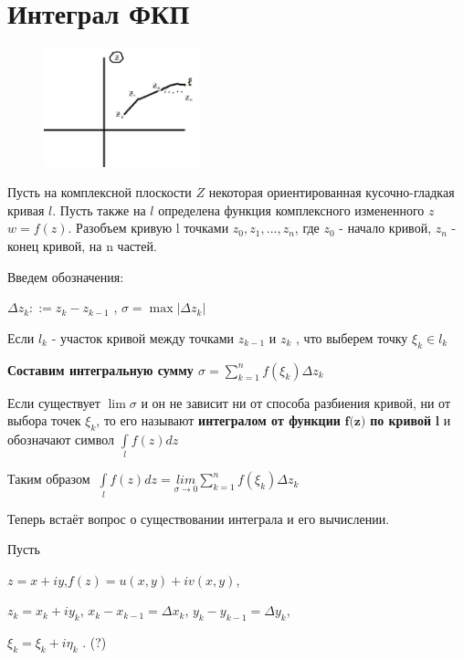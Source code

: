 \documentclass[a4paper, 12pt]{report}
\begin{document}
\section{Интеграл ФКП}
\bigskip
\begin{figure} 
    
    \includegraphics[width=0.4\textwidth]{123.png}
\end{figure}
Пусть на комплексной плоскости \(  Z \)  некоторая ориентированная кусочно-гладкая кривая \( l \). 
Пусть также на \(  l \) определена функция комплексного измененного \( z \)   \(w = f(z)\). Разобъем кривую l точками \( z_0, z_1, ... , z_n \), где \( z_0 \) - начало кривой, \( z_n \) - конец кривой, на n частей.
\par\bigskip
Введем обозначения:  
\item \( \Delta z_k ::= z_k - z_{k-1} \) , \( \sigma = \max | \Delta z_k| \)
\item Если  \( l_k \) - участок кривой между точками \( z_{k-1}\) и \( z_k\) , что выберем точку \( \xi_k \in l_k \) 
\par\bigskip
\textbf
\textbf{Составим интегральную сумму  \( \sigma = \sum\limits_{k=1}^n  f( \xi_k ) \Delta z_k \)}
\par\bigskip Если существует \( \lim\sigma \) и он не зависит ни от способа разбиения кривой, ни от выбора точек \( \xi_k \), то его называют \textbf{интегралом от функции} \( \textbf{f(z)} \) \textbf{по кривой} \(  \textbf{l} \) и обозначают символ \(  \int\limits_l  f(z)dz\) 
\par\bigskip
Таким образом \( \ \int\limits_l f(z)dz = \underset{\sigma \to 0}{lim}  \sum\limits_{k=1}^n  f( \xi_k ) \Delta z_k\) 
\par\bigskip
Теперь встаёт вопрос о существовании интеграла и его вычислении.
\par\bigskip
Пусть
\par \( z= x + iy\),\quad  \(  f(z)= u(x,y)+iv(x,y)\),  
\par \(  z_k=x_k+iy_k \), \quad \(  x_k-x_{k-1}= \Delta x_k\), \quad
\(  y_k-y_{k-1}= \Delta y_k\), \par  \(\xi_k =\xi_k +i\eta_k \) . (?)
\end{document}
